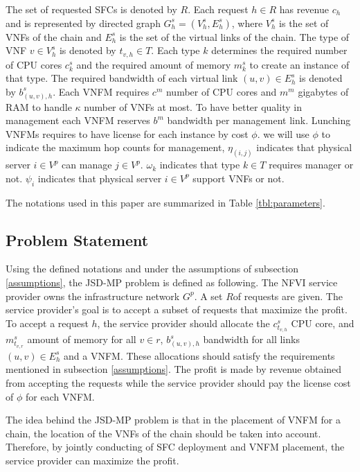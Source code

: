 The set of requested SFCs is denoted by \(R\).
Each request \(h \in R\) has revenue \(c_h\) and
is represented by directed graph \(G^s_h = (V^s_h, E^s_h)\),
where \(V^s_h\) is the set of VNFs of the chain and \(E^s_h\) is the set of the virtual links of the chain.
The type of VNF \(v \in V^s_h\) is denoted by \(t_{v,h} \in T\).
Each type \(k\) determines the required number of CPU cores \(c^s_k\)
and the required amount of memory \(m^s_k\) to create an instance of that type.
The required bandwidth of each virtual link \((u,v) \in E^s_h\) is denoted by \(b^s_{(u,v),h}\).
Each VNFM requires \(c^m\) number of CPU cores and \(m^m\) gigabytes of RAM to handle \(\kappa\) number of VNFs at most.
To have better quality in management each VNFM reserves \(b^m\) bandwidth per management link.
Lunching VNFMs requires to have license for each instance by cost \(\phi\).
we will use \(\phi\) to indicate the maximum hop counts for management,
\(\eta_{(i, j)}\) indicates that physical server \(i \in V^p\) can manage \(j \in V^p\).
\(\omega_k\) indicates that type \(k \in T\) requires manager or not.
\(\psi_i\) indicates that physical server \(i \in V^p\) support VNFs or not.

The notations used in this paper are summarized in Table \ref{tbl:parameters}.

\subsection{Problem Statement}
Using the defined notations and under the assumptions of subsection \ref{assumptions},
the JSD-MP problem is defined as following. The NFVI service provider owns the infrastructure network \(G^p\).
A set \(R\)of requests are given. The service provider's goal is to accept a subset of requests that maximize the profit.
To accept a request \(h\), the service provider should allocate the \(c^s_{t_{v,h}}\) CPU core, and \(m^s_{t_{v,r}}\) amount of memory for all \(v \in r\),
\(b^s_{(u,v),h}\) bandwidth for all links \((u,v) \in E^s_h\) and a VNFM.
These allocations should satisfy the requirements mentioned in subsection \ref{assumptions}.
The profit is made by revenue obtained from accepting the requests while the service provider should pay the license cost of \(\phi\) for each VNFM.

The idea behind the JSD-MP problem is that in the placement of VNFM for a chain, the location of the VNFs of the chain should be taken into account.
Therefore, by jointly conducting of SFC deployment and VNFM placement, the service provider can maximize the profit.

